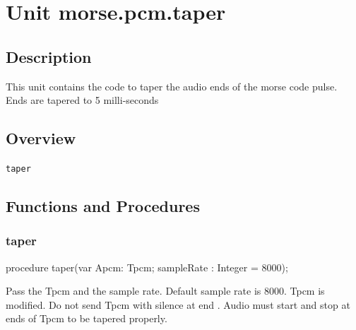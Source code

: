 \documentclass{report}
\newif\ifpdf
\begin{document}
\chapter{Unit morse.pcm.taper}
\label{morse.pcm.taper}
\section{Description}
This unit contains the code to taper the audio ends of the morse code pulse. Ends are tapered to 5 milli{-}seconds
\section{Overview}
\begin{description}
\item[\texttt{taper}]
\end{description}
\section{Functions and Procedures}
\ifpdf
\subsection*{\large{\textbf{taper}}\normalsize\hspace{1ex}\hrulefill}
\else
\subsection*{taper}
\fi
\label{morse.pcm.taper-taper}
\begin{list}{}{
\setlength{\itemindent}{0cm}
\setlength{\listparindent}{0cm}
\setlength{\leftmargin}{\evensidemargin}
\addtolength{\leftmargin}{\tmplength}
\settowidth{\labelsep}{X}
\addtolength{\leftmargin}{\labelsep}
\setlength{\labelwidth}{\tmplength}
}
\item[\textbf{Declaration}\hfill]
\ifpdf
\begin{flushleft}
\fi
\begin{ttfamily}
procedure taper(var Apcm: Tpcm; sampleRate : Integer = 8000);\end{ttfamily}

\ifpdf
\end{flushleft}
\fi

\par
\item[\textbf{Description}]
Pass the Tpcm and the sample rate. Default sample rate is 8000. Tpcm is modified. Do not send Tpcm with silence at end . Audio must start and stop at ends of Tpcm to be tapered properly.

\end{list}
\end{document}
